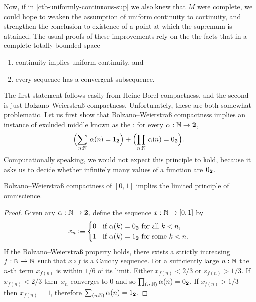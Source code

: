 Now, if in \autoref{ctb-uniformly-continuous-sup} we also knew that $M$ were complete, we
could hope to weaken the assumption of uniform continuity to continuity, and strengthen
the conclusion to existence of a point at which the supremum is attained. The usual proofs
of these improvements rely on the the facts that in a complete totally bounded space
%
\begin{enumerate}
\item continuity implies uniform continuity, and
\item every sequence has a convergent subsequence.
\end{enumerate}
%
The first statement follows easily from Heine-Borel compactness, and the second is just
Bolzano--Weierstra\ss{} compactness.
Unfortunately, these are both somewhat problematic. Let
us first show that Bolzano--Weierstra\ss{} compactness implies an instance of excluded middle
known as the :
for every $\alpha : \mathbb{N} \to \mathbf{2}$,
% 
\begin{equation} \label{eq:lpo}
  \Parens{\sm{n : \N} \alpha(n) = \btrue} +
  \Parens{\prd{n : \N} \alpha(n) = \bfalse}.
\end{equation}
%
Computationally speaking, we would not expect this principle to hold, because it asks us to decide
whether infinitely many values of a function are~${0_{\mathbf{2}}}$.
  
\begin{thm} \label{analysis-bw-lpo}
  Bolzano--Weierstra\ss{} compactness of $[0,1]$ implies the limited principle of omniscience.
\end{thm}

\begin{proof}
  Given any $\alpha : \mathbb{N} \to \mathbf{2}$, define the sequence $x : \mathbb{N} \to [0,1]$ by
  \begin{equation*}
    x_n \vcentcolon\equiv
    \begin{cases}
      0 & \text{if $\alpha(k) = {0_{\mathbf{2}}}$ for all $k < n$,}\\
      1 & \text{if $\alpha(k) = {1_{\mathbf{2}}}$ for some $k < n$}.
    \end{cases}
  \end{equation*}
  If the Bolzano--Weierstra\ss{} property holds, there exists a strictly increasing $f : \mathbb{N} \to
  \mathbb{N}$ such that $x \circ f$ is a Cauchy sequence. For a sufficiently large $n :
  \mathbb{N}$ the $n$-th term $x_{f(n)}$ is within $1/6$ of its limit. Either $x_{f(n)} < 2/3$ or
  $x_{f(n)} > 1/3$. If $x_{f(n)} < 2/3$ then~$x_n$ converges to $0$ and so $\prd{n : \N}
  \alpha(n) = \bfalse$. If $x_{f(n)} > 1/3$ then $x_{f(n)} = 1$, therefore $\sm{n : \N}
  \alpha(n) = \btrue$.
\end{proof}

